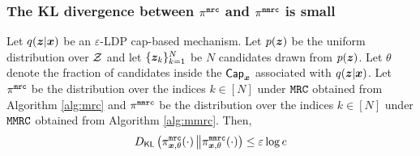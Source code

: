 \subsubsection{The KL divergence between \texorpdfstring{$\pi^{\texttt{mrc}}$}{} and \texorpdfstring{$\pi^{\texttt{mmrc}}$}{} is small}
\begin{lemma}\label{lemma:kl}
Let $q({\boldsymbol{z}}|{\boldsymbol{x}})$ be an $\varepsilon$-LDP cap-based mechanism. Let $p({\boldsymbol{z}})$ be the uniform distribution over $\mathcal{Z}$ and let $\{{\boldsymbol{z}}_k\}_{k=1}^{N}$ be $N$ candidates drawn from $p({\boldsymbol{z}})$. Let $\theta$ denote the fraction of candidates inside the $\mathsf{Cap}_{{\boldsymbol{x}}}$ associated with $q({\boldsymbol{z}}|{\boldsymbol{x}})$. Let $\pi^{\texttt{mrc}}$ be the distribution over the indices $k \in [N]$ under $\texttt{MRC}$ obtained from Algorithm \ref{alg:mrc} and $\pi^{\texttt{mmrc}}$ be the distribution over the indices $k \in [N]$ under $\texttt{MMRC}$ obtained from Algorithm \ref{alg:mmrc}. Then,
\begin{align}
    {D}_{\mathsf{KL}}\left( \pi^{\texttt{mrc}}_{{\boldsymbol{x}}, \theta}(\cdot)\, \middle\Vert \pi^{\texttt{mmrc}}_{{\boldsymbol{x}}, \theta}(\cdot) \right) \leq \varepsilon \log e
\end{align}
\end{lemma}
